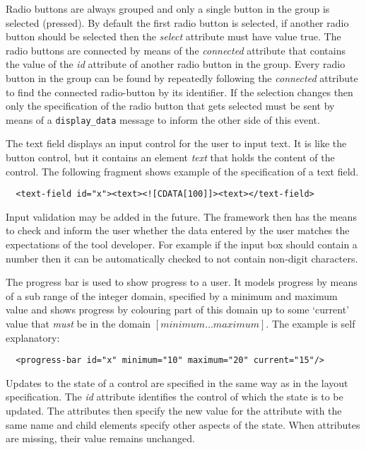 \documentclass{article}
\newcommand{\msg}[1]{\texttt{#1}}
\begin{document}
   \noindent Radio buttons are always grouped and only a single button in the
   group is selected (pressed).  By default the first radio button is selected,
   if another radio button should be selected then the \textit{select}
   attribute must have value true. The radio buttons are connected by means of
   the \textit{connected} attribute that contains the value of the \textit{id}
   attribute of another radio button in the group. Every radio button in the
   group can be found by repeatedly following the \textit{connected} attribute
   to find the connected radio-button by its identifier. If the selection
   changes then only the specification of the radio button that gets selected
   must be sent by means of a \msg{display\_data} message to inform the other
   side of this event.

   The text field displays an input control for the user to input text. It is
   like the button control, but it contains an element \textit{text} that
   holds the content of the control. The following fragment shows example of
   the specification of a text field.
   
   \small \begin{verbatim}
  <text-field id="x"><text><![CDATA[100]]><text></text-field>\end{verbatim} \normalsize

   Input validation may be added in the future. The framework then has the means
   to check and inform the user whether the data entered by the user matches
   the expectations of the tool developer.  For example if the input box should
   contain a number then it can be automatically checked to not contain
   non-digit characters.

   The progress bar is used to show progress to a user. It models progress by
   means of a sub range of the integer domain, specified by a minimum and
   maximum value and shows progress by colouring part of this domain up to some
   `current' value that \emph{must} be in the domain $[ minimum \ldots
   maximum ]$. The example is self explanatory:

   \small \begin{verbatim}
  <progress-bar id="x" minimum="10" maximum="20" current="15"/>\end{verbatim} \normalsize

   \noindent Updates to the state of a control are specified in the same way as
   in the layout specification. The \textit{id} attribute identifies the
   control of which the state is to be updated. The attributes then specify the
   new value for the attribute with the same name and child elements specify
   other aspects of the state. When attributes are missing, their value remains
   unchanged.
\end{document}
